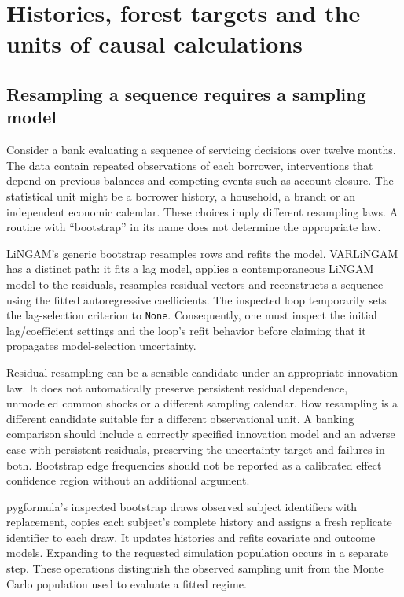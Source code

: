 \chapter{Histories, forest targets and the units of causal calculations}
\label{v131:histories-forests}

\section{Resampling a sequence requires a sampling model}

Consider a bank evaluating a sequence of servicing decisions over twelve
months. The data contain repeated observations of each borrower, interventions
that depend on previous balances and competing events such as account closure.
The statistical unit might be a borrower history, a household, a branch or an
independent economic calendar. These choices imply different resampling laws.
A routine with ``bootstrap'' in its name does not determine the appropriate law.

LiNGAM's generic bootstrap resamples rows and refits the model. VARLiNGAM has
a distinct path: it fits a lag model, applies a contemporaneous LiNGAM model to
the residuals, resamples residual vectors and reconstructs a sequence using the
fitted autoregressive coefficients. The inspected loop temporarily sets the
lag-selection criterion to \texttt{None}. Consequently, one must inspect the
initial lag/coefficient settings and the loop's refit behavior before claiming
that it propagates model-selection uncertainty.\cite{v131_sw_lingam}

Residual resampling can be a sensible candidate under an appropriate innovation
law. It does not automatically preserve persistent residual dependence,
unmodeled common shocks or a different sampling calendar. Row resampling is a
different candidate suitable for a different observational unit. A banking
comparison should include a correctly specified innovation model and an adverse
case with persistent residuals, preserving the uncertainty target and failures
in both. Bootstrap edge frequencies should not be reported as a calibrated
effect confidence region without an additional argument.

pygformula's inspected bootstrap draws observed subject identifiers with
replacement, copies each subject's complete history and assigns a fresh replicate
identifier to each draw. It updates histories and refits covariate and outcome
models. Expanding to the requested simulation population occurs in a separate
step. These operations distinguish the observed sampling unit from the Monte
Carlo population used to evaluate a fitted regime.\cite{v131_sw_pygformula}

